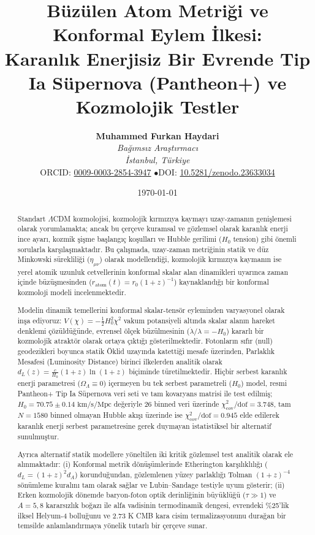 \documentclass[11pt,a4paper]{article}
\title{\textbf{Büzülen Atom Metriği ve Konformal Eylem İlkesi: \\ Karanlık Enerjisiz Bir Evrende Tip Ia Süpernova (Pantheon+) ve Kozmolojik Testler}}
\author{
    \textbf{Muhammed Furkan Haydari} \\
    \textit{Bağımsız Araştırmacı} \\
    \textit{İstanbul, Türkiye} \\
    \small ORCID: \href{https://orcid.org/0009-0003-2854-3947}{0009-0003-2854-3947} \quad$\bullet$\quad \small DOI: \href{https://doi.org/10.5281/zenodo.23633034}{10.5281/zenodo.23633034}
}
\date{\today}
\begin{document}
\shorthandoff{=}

\maketitle

\begin{abstract}
    Standart $\Lambda$CDM kozmolojisi, kozmolojik kırmızıya kaymayı uzay-zamanın genişlemesi olarak yorumlamakta; ancak bu çerçeve kuramsal ve gözlemsel olarak karanlık enerji ince ayarı, kozmik şişme başlangıç koşulları ve Hubble gerilimi ($H_0$ tension) gibi önemli sorularla karşılaşmaktadır. Bu çalışmada, uzay-zaman metriğinin statik ve düz Minkowski sürekliliği ($\eta_{\mu\nu}$) olarak modellendiği, kozmolojik kırmızıya kaymanın ise yerel atomik uzunluk cetvellerinin konformal skalar alan dinamikleri uyarınca zaman içinde büzüşmesinden ($r_{\mathrm{atom}}(t) = r_0 (1+z)^{-1}$) kaynaklandığı bir konformal kozmoloji modeli incelenmektedir.

    Modelin dinamik temellerini konformal skalar-tensör eyleminden varyasyonel olarak inşa ediyoruz: $V(\chi) = -\frac{1}{2} H_0^2 \chi^2$ vakum potansiyeli altında skalar alanın hareket denklemi çözüldüğünde, evrensel ölçek büzülmesinin ($\dot{\lambda}/\lambda = -H_0$) kararlı bir kozmolojik atraktör olarak ortaya çıktığı gösterilmektedir. Fotonların sıfır (null) geodezikleri boyunca statik Öklid uzayında katettiği mesafe üzerinden, Parlaklık Mesafesi (Luminosity Distance) birinci ilkelerden analitik olarak $d_L(z) = \frac{c}{H_0} (1+z) \ln(1+z)$ biçiminde türetilmektedir. Hiçbir serbest karanlık enerji parametresi ($\Omega_\Lambda \equiv 0$) içermeyen bu tek serbest parametreli ($H_0$) model, resmi Pantheon+ Tip Ia Süpernova veri seti ve tam kovaryans matrisi ile test edilmiş; $H_0 = 70.75 \pm 0.14\text{ km/s/Mpc}$ değeriyle 26 binned veri üzerinde $\chi^2_{\mathrm{cov}}/\text{dof} = 3.748$, tam $N=1580$ binned olmayan Hubble akışı üzerinde ise $\chi^2_{\mathrm{cov}}/\text{dof} = 0.945$ elde edilerek karanlık enerji serbest parametresine gerek duymayan istatistiksel bir alternatif sunulmuştur.

    Ayrıca alternatif statik modellere yöneltilen iki kritik gözlemsel test analitik olarak ele alınmaktadır: (i) Konformal metrik dönüşümlerinde Etherington karşılıklılığı ($d_L = (1+z)^2 d_A$) korunduğundan, gözlemlenen yüzey parlaklığı Tolman $(1+z)^{-4}$ sönümleme kuralını tam olarak sağlar ve Lubin--Sandage testiyle uyum gösterir; (ii) Erken kozmolojik dönemde baryon-foton optik derinliğinin büyüklüğü ($\tau \gg 1$) ve $A=5, 8$ kararsızlık boğazı ile alfa vadisinin termodinamik dengesi, evrendeki \%25'lik ilksel Helyum-4 bolluğunu ve 2.73 K CMB kara cisim termalizasyonunu durağan bir temsilde anlamlandırmaya yönelik tutarlı bir çerçeve sunar.
\end{abstract}
\end{document}
